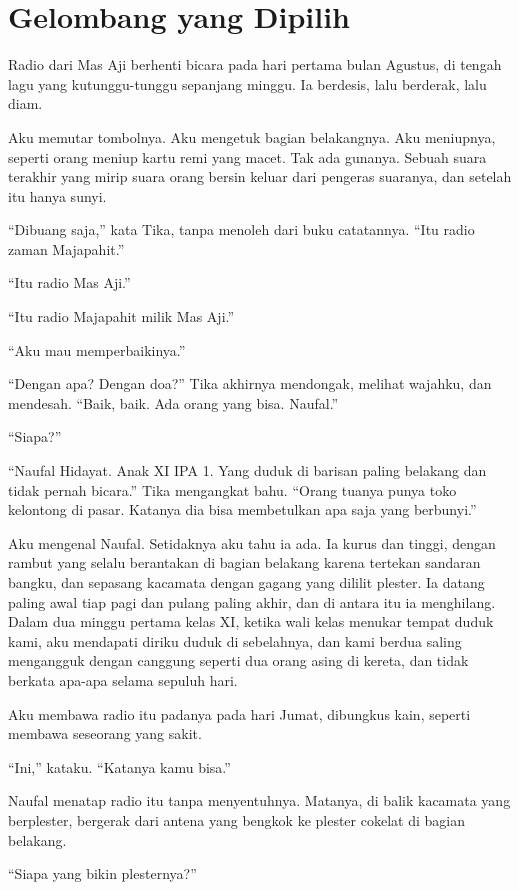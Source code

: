 \documentclass[11pt,twoside,openany]{book}
\begin{document}
\chapter{Gelombang yang Dipilih}
Radio dari Mas Aji berhenti bicara pada hari pertama bulan Agustus, di tengah lagu yang kutunggu-tunggu sepanjang minggu. Ia berdesis, lalu berderak, lalu diam.

Aku memutar tombolnya. Aku mengetuk bagian belakangnya. Aku meniupnya, seperti orang meniup kartu remi yang macet. Tak ada gunanya. Sebuah suara terakhir yang mirip suara orang bersin keluar dari pengeras suaranya, dan setelah itu hanya sunyi.

``Dibuang saja,'' kata Tika, tanpa menoleh dari buku catatannya. ``Itu radio zaman Majapahit.''

``Itu radio Mas Aji.''

``Itu radio Majapahit milik Mas Aji.''

``Aku mau memperbaikinya.''

``Dengan apa? Dengan doa?'' Tika akhirnya mendongak, melihat wajahku, dan mendesah. ``Baik, baik. Ada orang yang bisa. Naufal.''

``Siapa?''

``Naufal Hidayat. Anak XI IPA 1. Yang duduk di barisan paling belakang dan tidak pernah bicara.'' Tika mengangkat bahu. ``Orang tuanya punya toko kelontong di pasar. Katanya dia bisa membetulkan apa saja yang berbunyi.''

Aku mengenal Naufal. Setidaknya aku tahu ia ada. Ia kurus dan tinggi, dengan rambut yang selalu berantakan di bagian belakang karena tertekan sandaran bangku, dan sepasang kacamata dengan gagang yang dililit plester. Ia datang paling awal tiap pagi dan pulang paling akhir, dan di antara itu ia menghilang. Dalam dua minggu pertama kelas XI, ketika wali kelas menukar tempat duduk kami, aku mendapati diriku duduk di sebelahnya, dan kami berdua saling mengangguk dengan canggung seperti dua orang asing di kereta, dan tidak berkata apa-apa selama sepuluh hari.

Aku membawa radio itu padanya pada hari Jumat, dibungkus kain, seperti membawa seseorang yang sakit.

``Ini,'' kataku. ``Katanya kamu bisa.''

Naufal menatap radio itu tanpa menyentuhnya. Matanya, di balik kacamata yang berplester, bergerak dari antena yang bengkok ke plester cokelat di bagian belakang.

``Siapa yang bikin plesternya?''
\end{document}
